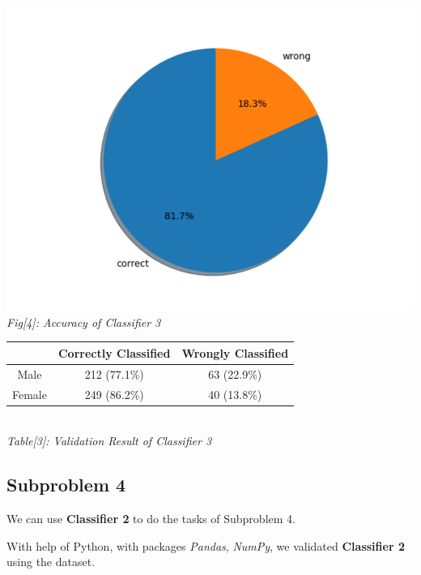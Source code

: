 \documentclass[12pt]{article}
\begin{document}
			\begin{center}
				\includegraphics[scale=0.7]{fig5} \\
				\textit{Fig[4]: Accuracy of Classifier 3} \\
				\vspace{1cm}
				\begin{tabular}{||c||c|c||}
					\hline
					& Correctly Classified & Wrongly Classified \\
					\hline \hline
					Male & 212 (77.1\%) & 63 (22.9\%) \\
					\hline
					Female & 249 (86.2\%) & 40 (13.8\%) \\
					\hline
				\end{tabular} \\
				\vspace{3mm}
				\textit{Table[3]: Validation Result of Classifier 3}
			\end{center}
		
		\newpage
		\subsection{Subproblem 4}

			We can use \textbf{Classifier 2} to do the tasks of Subproblem 4.
			
			With help of Python, with packages \textit{Pandas}, \textit{NumPy},
			we validated \textbf{Classifier 2} using the dataset.
			
\end{document}
